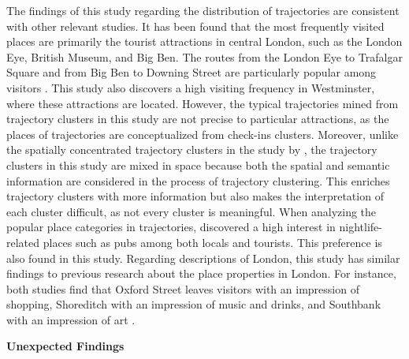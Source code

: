 \documentclass{article}
\theoremstyle{remark}
\begin{document}
The findings of this study regarding the distribution of trajectories are consistent with other relevant studies. It has been found that the most frequently visited places are primarily the tourist attractions in central London, such as the London Eye, British Museum, and Big Ben. The routes from the London Eye to Trafalgar Square and from Big Ben to Downing Street are particularly popular among visitors \citep{yin_diversified_2011,zheng_mining_2012}. This study also discovers a high visiting frequency in Westminster, where these attractions are located. However, the typical trajectories mined from trajectory clusters in this study are not precise to particular attractions, as the places of trajectories are conceptualized from check-ins clusters. Moreover, unlike the spatially concentrated trajectory clusters in the study by \cite{straumann_towards_2014}, the trajectory clusters in this study are mixed in space because both the spatial and semantic information are considered in the process of trajectory clustering. This enriches trajectory clusters with more information but also makes the interpretation of each cluster difficult, as not every cluster is meaningful. When analyzing the popular place categories in trajectories, \cite{ferreira_uncovering_2020} discovered a high interest in nightlife-related places such as pubs among both locals and tourists. This preference is also found in this study. Regarding descriptions of London, this study has similar findings to previous research about the place properties in London. For instance, both studies find that Oxford Street leaves visitors with an impression of shopping, Shoreditch with an impression of music and drinks, and Southbank with an impression of art \citep{bahrehdar_description_2018}.

\textbf{Unexpected Findings}
\end{document}
